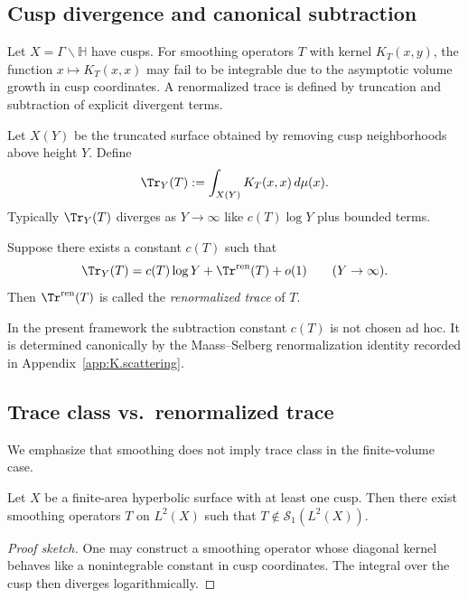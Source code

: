 \subsection{Cusp divergence and canonical subtraction}
\label{subsec:L.cuspdiv}

Let $X=\Gamma\backslash\mathbb{H}$ have cusps.
For smoothing operators $T$ with kernel $K_T(x,y)$, the function $x\mapsto K_T(x,x)$ may fail to be integrable due to
the asymptotic volume growth in cusp coordinates.  A renormalized trace is defined by truncation and subtraction of
explicit divergent terms.

Let $X(Y)$ be the truncated surface obtained by removing cusp neighborhoods above height $Y$.
Define
\[
\Tr_Y(T):=\int_{X(Y)} K_T(x,x)\,d\mu(x).
\]
Typically $\Tr_Y(T)$ diverges as $Y\to\infty$ like $c(T)\log Y$ plus bounded terms.

\begin{definition}
\label{def:L.renorm.trace}
Suppose there exists a constant $c(T)$ such that
\[
\Tr_Y(T) = c(T)\log Y + \Tr^{\mathrm{ren}}(T) + o(1)
\qquad (Y\to\infty).
\]
Then $\Tr^{\mathrm{ren}}(T)$ is called the \emph{renormalized trace} of $T$.
\end{definition}

\begin{remark}
\label{rem:L.renorm.canonical}
In the present framework the subtraction constant $c(T)$ is not chosen ad hoc.  It is determined canonically by the
Maass--Selberg renormalization identity recorded in Appendix~\ref{app:K.scattering}.
\end{remark}

\subsection{Trace class vs.\ renormalized trace}
\label{subsec:L.traceclass.vs.renorm}

We emphasize that smoothing does not imply trace class in the finite-volume case.

\begin{proposition}
\label{prop:L.smoothing.not.trace}
Let $X$ be a finite-area hyperbolic surface with at least one cusp.
Then there exist smoothing operators $T$ on $L^2(X)$ such that $T\notin\mathcal{S}_1(L^2(X))$.
\end{proposition}

\begin{proof}[Proof sketch]
One may construct a smoothing operator whose diagonal kernel behaves like a nonintegrable constant in cusp
coordinates.  The integral over the cusp then diverges logarithmically.
\end{proof}

